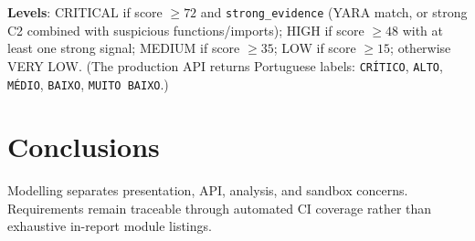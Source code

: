 \textbf{Levels}: CRITICAL if score $\geq 72$ and
\texttt{strong\_evidence} (YARA match, or strong C2 combined with suspicious functions/imports);
HIGH if score $\geq 48$ with at least one strong signal; MEDIUM if score $\geq 35$; LOW if
score $\geq 15$; otherwise VERY LOW. (The production API returns Portuguese labels:
\texttt{CRÍTICO}, \texttt{ALTO}, \texttt{MÉDIO}, \texttt{BAIXO}, \texttt{MUITO BAIXO}.)

\section{Conclusions}

Modelling separates presentation, API, analysis, and sandbox concerns. Requirements remain
traceable through automated CI coverage rather than exhaustive in-report module listings.
